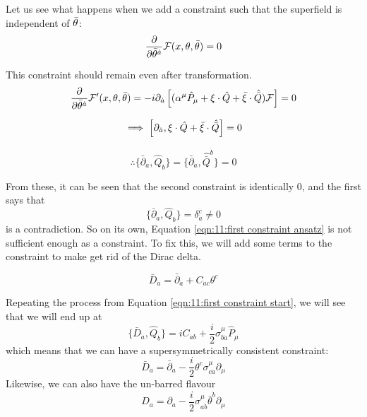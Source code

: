 Let us see what happens when we add a constraint such that the superfield is independent of $\Bar{\theta}$:
\begin{equation}
    \diff{}{\Bar{\theta}^{\Dot{a}}} \mathcal{F}(x, \theta, \Bar{\theta}) = 0
    \label{eqn:11:first constraint ansatz}
\end{equation}

This constraint should remain even after transformation.
\begin{equation}
    \diff{}{\Bar{\theta}^{\Dot{a}}} \mathcal{F^\prime}(x, \theta, \Bar{\theta}) = -i \partial_{\dot{a}} \left[(\alpha^\mu \hat{P}_\mu + \xi\cdot \hat{Q} + \Bar{\xi} \cdot \hat{\bar{Q}}) \mathcal{F} \right] = 0
    \label{eqn:11:first constraint start}
\end{equation}

\begin{equation}
    \implies \left[ \partial_{\dot{a}}, \xi \cdot \hat{Q} + \Bar{\xi} \cdot \hat{\Bar{Q}} \right] = 0
\end{equation}

\begin{equation}
    \therefore \{ \bar{\partial}_{\dot{a}} , \hat{Q}_b \} = \{ \bar{\partial}_{\dot{a}}, \hat{\bar{Q}}^{\dot{b}}\} = 0
\end{equation}

From these, it can be seen that the second constraint is identically 0, and the first says that
\begin{equation}
    \{ \bar{\partial}_{\dot{a}} , \hat{Q}_b \} = \delta^{\dot{c}}_{\dot{a}} \neq 0
\end{equation}
is a contradiction. So on its own, Equation \ref{eqn:11:first constraint ansatz} is not sufficient enough as a constraint. To fix this, we will add some terms to the constraint to make get rid of the Dirac delta.

\begin{equation}
    \bar{D}_{\dot{a}} = \bar{\partial}_{\dot{a}} + C_{\dot{a}c}\theta^c
    \label{eqn:11:second constraint ansatz}
\end{equation}

Repeating the process from Equation \ref{eqn:11:first constraint start}, we will see that we will end up at
\begin{equation}
    \{\bar{D}_{\dot{a}}, \hat{Q}_b \} = i C_{\dot{a}b} + \frac{i}{2} \sigma^\mu_{b\dot{a}} \hat{P}_\mu
    \label{eqn:11:second constraint end}
\end{equation}
which means that we can have a supersymmetrically consistent constraint:
\begin{equation}
    \bar{D}_{\dot{a}} = \bar{\partial}_{\dot{a}} - \frac{i}{2} \theta^c \sigma^\mu_{c\dot{a}} \partial_\mu
    \label{eqn:11:left chiral constraint}
\end{equation}
Likewise, we can also have the un-barred flavour
\begin{equation}
    D_a = \partial_a - \frac{i}{2} \sigma^\mu_{a\dot{b}} \bar{\theta}^{\dot{b}} \partial_\mu
    \label{eqn:11:right chiral constraint}
\end{equation}

